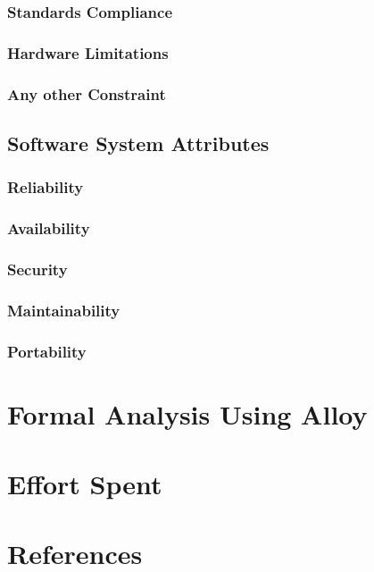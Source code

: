 \documentclass[a4paper]{article}
\begin{document}
    \subsubsection{Standards Compliance}
    
    \subsubsection{Hardware Limitations}
    
    \subsubsection{Any other Constraint}
    
    \subsection{Software System Attributes}
    
    \subsubsection{Reliability}
    
    \subsubsection{Availability}
    
    \subsubsection{Security}
    
    \subsubsection{Maintainability}
    
    \subsubsection{Portability}
    
    \section{Formal Analysis Using Alloy}
    
    \section{Effort Spent}
    
    \section{References}
    
    
    
\end{document}
